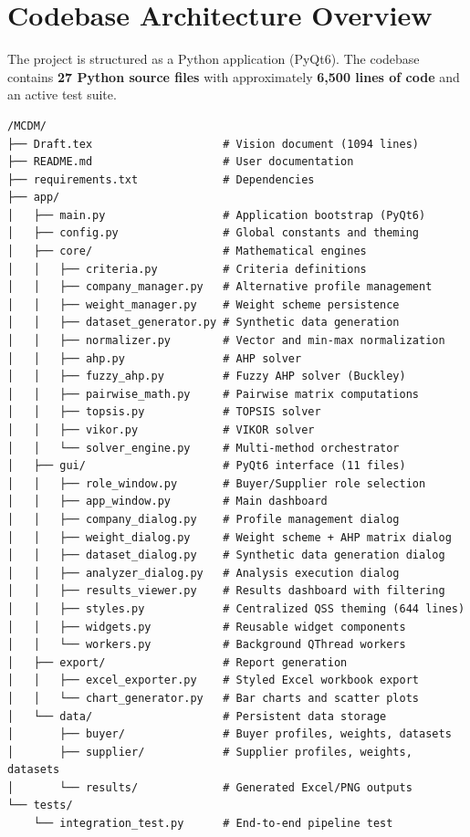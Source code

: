 \documentclass[11pt]{article}
\begin{document}
\section{Codebase Architecture Overview}

The project is structured as a Python application (PyQt6). The codebase contains \textbf{27 Python source files} with approximately \textbf{6,500 lines of code} and an active test suite. 

\begin{verbatim}
/MCDM/
├── Draft.tex                    # Vision document (1094 lines)
├── README.md                    # User documentation
├── requirements.txt             # Dependencies
├── app/
│   ├── main.py                  # Application bootstrap (PyQt6)
│   ├── config.py                # Global constants and theming
│   ├── core/                    # Mathematical engines
│   │   ├── criteria.py          # Criteria definitions
│   │   ├── company_manager.py   # Alternative profile management
│   │   ├── weight_manager.py    # Weight scheme persistence
│   │   ├── dataset_generator.py # Synthetic data generation
│   │   ├── normalizer.py        # Vector and min-max normalization
│   │   ├── ahp.py               # AHP solver
│   │   ├── fuzzy_ahp.py         # Fuzzy AHP solver (Buckley)
│   │   ├── pairwise_math.py     # Pairwise matrix computations
│   │   ├── topsis.py            # TOPSIS solver
│   │   ├── vikor.py             # VIKOR solver
│   │   └── solver_engine.py     # Multi-method orchestrator
│   ├── gui/                     # PyQt6 interface (11 files)
│   │   ├── role_window.py       # Buyer/Supplier role selection
│   │   ├── app_window.py        # Main dashboard
│   │   ├── company_dialog.py    # Profile management dialog
│   │   ├── weight_dialog.py     # Weight scheme + AHP matrix dialog
│   │   ├── dataset_dialog.py    # Synthetic data generation dialog
│   │   ├── analyzer_dialog.py   # Analysis execution dialog
│   │   ├── results_viewer.py    # Results dashboard with filtering
│   │   ├── styles.py            # Centralized QSS theming (644 lines)
│   │   ├── widgets.py           # Reusable widget components
│   │   └── workers.py           # Background QThread workers
│   ├── export/                  # Report generation
│   │   ├── excel_exporter.py    # Styled Excel workbook export
│   │   └── chart_generator.py   # Bar charts and scatter plots
│   └── data/                    # Persistent data storage
│       ├── buyer/               # Buyer profiles, weights, datasets
│       ├── supplier/            # Supplier profiles, weights, datasets
│       └── results/             # Generated Excel/PNG outputs
└── tests/
    └── integration_test.py      # End-to-end pipeline test
\end{verbatim}
\end{document}
